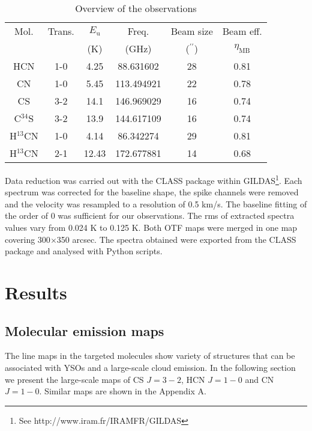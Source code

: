 \documentclass{aa}
\begin{document}
\begin{table}
\caption{Overview of the observations}             %
\label{table:1}      %
\centering                          %
\begin{tabular}{c c c c c c}        %
\hline\hline                 %
Mol. & Trans. & $E_\mathrm{u}$ & Freq. &  Beam size & Beam eff.\\
 & & (K) & (GHz) & ($^{\prime\prime}$) & $\eta_\mathrm{MB}$\\
\hline                        %
HCN & 1-0 & 4.25 & 88.631602 & 28 & 0.81\\
CN & 1-0 & 5.45 & 113.494921 & 22 & 0.78\\
CS & 3-2 & 14.1 & 146.969029 & 16 & 0.74\\
C$^{34}$S & 3-2 & 13.9 & 144.617109 & 16 & 0.74\\
H$^{13}$CN & 1-0 & 4.14 & 86.342274 & 29 & 0.81\\
H$^{13}$CN & 2-1 & 12.43 & 172.677881 & 14 & 0.68\\
\hline                                   
\end{tabular}
\end{table}

Data reduction was carried out with the CLASS package within GILDAS\footnote{See http://www.iram.fr/IRAMFR/GILDAS}. Each spectrum was corrected for the baseline shape, the spike channels were removed and the velocity was resampled to a resolution of 0.5 km/s. The baseline fitting of the order of 0 was sufficient for our observations. The rms of extracted spectra values vary from 0.024 K to 0.125 K. Both OTF maps were merged in one map covering 300$\times$350 arcsec. The spectra obtained were exported from the CLASS package and analysed with Python scripts. 


\section{Results}

\subsection{Molecular emission maps}

The line maps in the targeted molecules show variety of structures that can be associated with YSOs and a large-scale cloud emission. In the following section we present the large-scale maps of CS $J=3-2$, HCN $J=1-0$ and CN $J=1-0$. Similar maps are shown in the Appendix A.
\end{document}
